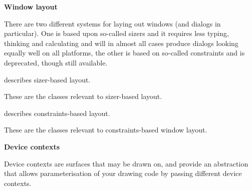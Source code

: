 {\large {\bf Window layout}}

There are two different systems for laying out windows (and dialogs in particular).
One is based upon so-called sizers and it requires less typing, thinking and calculating
and will in almost all cases produce dialogs looking equally well on all platforms, the
other is based on so-called constraints and is deprecated, though still available.

 describes sizer-based layout.

These are the classes relevant to sizer-based layout.

\twocolwidtha{6cm}
\begin{twocollist}\itemsep=0pt
\end{twocollist}

 describes constraints-based layout.

These are the classes relevant to constraints-based window layout.

\twocolwidtha{6cm}
\begin{twocollist}\itemsep=0pt
\end{twocollist}

{\large {\bf Device contexts}}


Device contexts are surfaces that may be drawn on, and provide an
abstraction that allows parameterisation of your drawing code
by passing different device contexts.

